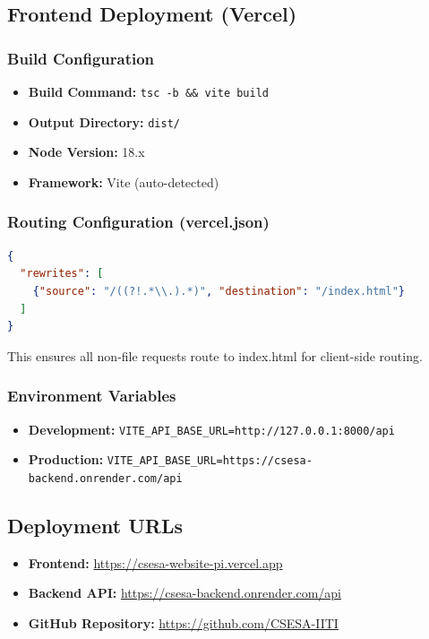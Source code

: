 \documentclass[11pt,a4paper]{article}
\begin{document}
\subsection{Frontend Deployment (Vercel)}

\subsubsection{Build Configuration}
\begin{itemize}[leftmargin=*]
    \item \textbf{Build Command:} \texttt{tsc -b \&\& vite build}
    \item \textbf{Output Directory:} \texttt{dist/}
    \item \textbf{Node Version:} 18.x
    \item \textbf{Framework:} Vite (auto-detected)
\end{itemize}

\subsubsection{Routing Configuration (vercel.json)}
\begin{lstlisting}[language=JSON]
{
  "rewrites": [
    {"source": "/((?!.*\\.).*)", "destination": "/index.html"}
  ]
}
\end{lstlisting}
This ensures all non-file requests route to index.html for client-side routing.

\subsubsection{Environment Variables}
\begin{itemize}[leftmargin=*]
    \item \textbf{Development:} \texttt{VITE\_API\_BASE\_URL=http://127.0.0.1:8000/api}
    \item \textbf{Production:} \texttt{VITE\_API\_BASE\_URL=https://csesa-backend.onrender.com/api}
\end{itemize}

\subsection{Deployment URLs}
\begin{itemize}[leftmargin=*]
    \item \textbf{Frontend:} \url{https://csesa-website-pi.vercel.app}
    \item \textbf{Backend API:} \url{https://csesa-backend.onrender.com/api}
    \item \textbf{GitHub Repository:} \url{https://github.com/CSESA-IITI}
\end{itemize}
\end{document}
